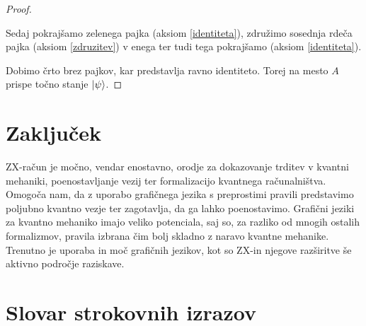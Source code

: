 \documentclass[mat1]{fmfdelo}
\begin{document}
\begin{proof}
\begin{center}
    \end{center}
    Sedaj pokrajšamo zelenega pajka (aksiom \ref{identiteta}), združimo sosednja rdeča pajka (aksiom \ref{zdruzitev}) v enega ter tudi tega pokrajšamo (aksiom \ref{identiteta}).
    \begin{center}
    \end{center}
    Dobimo črto brez pajkov, kar predstavlja ravno identiteto. Torej na mesto \(A\) prispe točno stanje \(\ket\psi\).
\end{proof}
\section{Zaključek}
ZX-račun je močno, vendar enostavno, orodje za dokazovanje trditev v kvantni mehaniki, poenostavljanje vezij ter formalizacijo kvantnega računalništva. Omogoča nam, da z uporabo grafičnega jezika s preprostimi pravili predstavimo poljubno kvantno vezje ter zagotavlja, da ga lahko poenostavimo. Grafični jeziki za kvantno mehaniko imajo veliko potenciala, saj so, za razliko od mnogih ostalih formalizmov, pravila izbrana čim bolj skladno z naravo kvantne mehanike. Trenutno je uporaba in moč grafičnih jezikov, kot so ZX-in njegove razširitve še aktivno področje raziskave. 

\section*{Slovar strokovnih izrazov}




\end{document}
